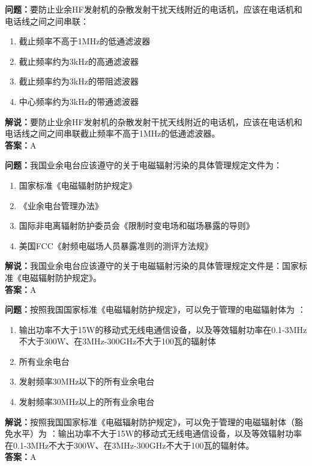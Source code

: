 \documentclass[UTF8]{ctexbook}
\begin{document}
\textbf{问题：}要防止业余HF发射机的杂散发射干扰天线附近的电话机，应该在电话机和电话线之间之间串联：
\begin{enumerate}[label=\Alph*), leftmargin=3em]
  \item 截止频率不高于1MHz的低通滤波器
  \item 截止频率约为3kHz的高通滤波器
  \item 截止频率约为3kHz的带阻滤波器
  \item 中心频率约为3kHz的带通滤波器
\end{enumerate}
\textbf{解说：}要防止业余HF发射机的杂散发射干扰天线附近的电话机，应该在电话机和电话线之间之间串联截止频率不高于1MHz的低通滤波器。\\
\textbf{答案：}A

\textbf{问题：}我国业余电台应该遵守的关于电磁辐射污染的具体管理规定文件为：
\begin{enumerate}[label=\Alph*), leftmargin=3em]
  \item 国家标准《电磁辐射防护规定》
  \item 《业余电台管理办法》
  \item 国际非电离辐射防护委员会《限制时变电场和磁场暴露的导则》
  \item 美国FCC《射频电磁场人员暴露准则的测评方法规》
\end{enumerate}
\textbf{解说：}我国业余电台应该遵守的关于电磁辐射污染的具体管理规定文件是：国家标准《电磁辐射防护规定》。\\
\textbf{答案：}A

\textbf{问题：}按照我国国家标准《电磁辐射防护规定》，可以免于管理的电磁辐射体为 ：
\begin{enumerate}[label=\Alph*), leftmargin=3em]
  \item 输出功率不大于15W的移动式无线电通信设备，以及等效辐射功率在0.1-3MHz不大于300W、在3MHz-300GHz不大于100瓦的辐射体
  \item 所有业余电台
  \item 发射频率30MHz以下的所有业余电台
  \item 发射频率30MHz以上的所有业余电台
\end{enumerate}
\textbf{解说：}按照我国国家标准《电磁辐射防护规定》，可以免于管理的电磁辐射体（豁免水平）为 ：输出功率不大于15W的移动式无线电通信设备，以及等效辐射功率在0.1-3MHz不大于300W、在3MHz-300GHz不大于100瓦的辐射体。\\
\textbf{答案：}A
\end{document}
